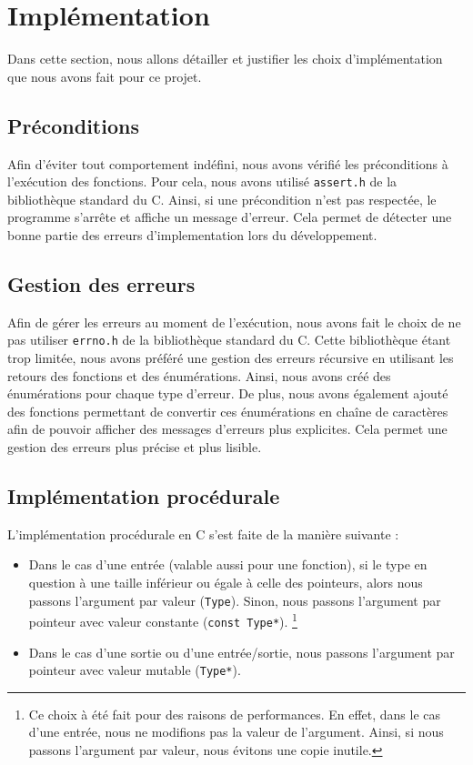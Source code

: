 \section{Implémentation}

Dans cette section, nous allons détailler et justifier les choix d'implémentation que nous avons fait pour ce projet.

\subsection{Préconditions}

Afin d'éviter tout comportement indéfini, nous avons vérifié les préconditions à l'exécution des fonctions.
Pour cela, nous avons utilisé \texttt{assert.h} de la bibliothèque standard du C. 
Ainsi, si une précondition n'est pas respectée, le programme s'arrête et affiche un message d'erreur.
Cela permet de détecter une bonne partie des erreurs d'implementation lors du développement.

\subsection{Gestion des erreurs}

Afin de gérer les erreurs au moment de l'exécution, nous avons fait le choix de ne pas utiliser \texttt{errno.h} de la bibliothèque standard du C.
Cette bibliothèque étant trop limitée, nous avons préféré une gestion des erreurs récursive en utilisant les retours des fonctions et des énumérations.
Ainsi, nous avons créé des énumérations pour chaque type d'erreur. De plus, nous avons également ajouté des fonctions permettant de convertir ces énumérations en chaîne de caractères afin de pouvoir afficher des messages d'erreurs plus explicites.
Cela permet une gestion des erreurs plus précise et plus lisible.

\subsection{Implémentation procédurale}

L'implémentation procédurale en C s'est faite de la manière suivante :

\begin{itemize}
    \item Dans le cas d'une entrée (valable aussi pour une fonction), si le type en question à une taille inférieur ou égale à celle des pointeurs, alors nous passons l'argument par valeur (\texttt{Type}).
    Sinon, nous passons l'argument par pointeur avec valeur constante (\texttt{const Type*}).
    \footnote{Ce choix à été fait pour des raisons de performances. En effet, dans le cas d'une entrée, nous ne modifions pas la valeur de l'argument. Ainsi, si nous passons l'argument par valeur, nous évitons une copie inutile.}
    \item Dans le cas d'une sortie ou d'une entrée/sortie, nous passons l'argument par pointeur avec valeur mutable (\texttt{Type*}).
\end{itemize}

